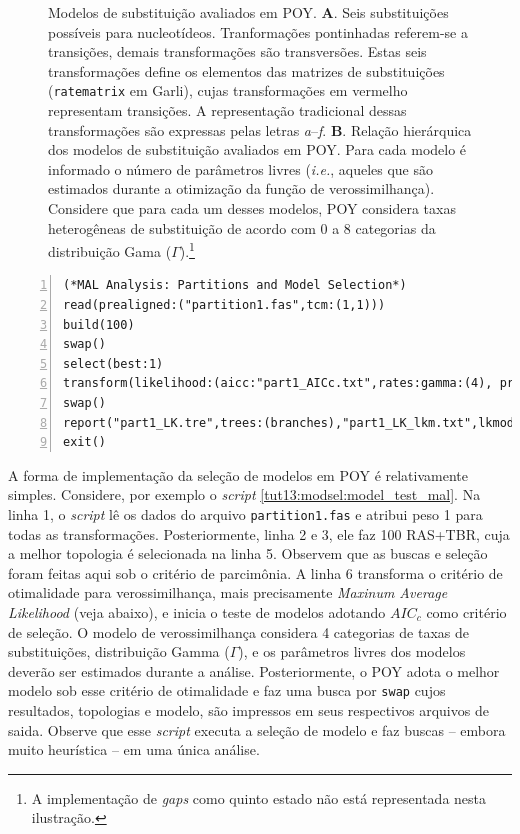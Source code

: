 \begin{refsection}
\begin{figure}[h!]
    {\caption[Modelos de substituição avaliados em POY]{Modelos de substituição avaliados em POY. \textbf{A}. Seis substituições possíveis para nucleotídeos. Tranformações pontinhadas referem-se a transições, demais transformações são transversões. Estas seis transformações define os elementos das matrizes de substituições (\texttt{ratematrix} em Garli), cujas transformações em vermelho representam transições. A representação tradicional dessas transformações são expressas pelas letras \textit{a}--\textit{f}. \textbf{B}. Relação hierárquica dos modelos de substituição avaliados em POY. Para cada modelo é informado o número de parâmetros livres (\textit{i.e.}, aqueles que são estimados durante a otimização da função de verossimilhança). Considere que para cada um desses modelos, POY considera taxas heterogêneas de substituição de acordo com 0 a 8 categorias da distribuição Gama ($\Gamma$).\footnote{A implementação de \textit{gaps} como quinto estado não está representada nesta ilustração.}}\label{tut13:fig:models}}
  \end{figure}

\scriptsize
\begin{lstlisting}[caption={\texttt{model\_test\_part1.poy}.},label=tut13:modsel:model_test_mal, numbers=left, numberblanklines=false]
(*MAL Analysis: Partitions and Model Selection*)
read(prealigned:("partition1.fas",tcm:(1,1)))
build(100)
swap()
select(best:1)
transform(likelihood:(aicc:"part1_AICc.txt",rates:gamma:(4), priors: estimate,mal))
swap()
report("part1_LK.tre",trees:(branches),"part1_LK_lkm.txt",lkmodel)
exit()

\end{lstlisting}
\normalsize

A forma de implementação da seleção de modelos em POY é relativamente simples. Considere, por exemplo o \textit{script} \ref{tut13:modsel:model_test_mal}. Na linha 1, o \textit{script} lê os dados do arquivo \texttt{partition1.fas} e atribui peso 1 para todas as transformações. Posteriormente, linha 2 e 3, ele faz 100 RAS+TBR, cuja a melhor topologia é selecionada na linha 5. Observem que as buscas e seleção foram feitas aqui sob o critério de parcimônia. A linha 6 transforma o critério de otimalidade para verossimilhança, mais precisamente \textit{Maxinum Average Likelihood} (veja abaixo), e inicia o teste de modelos adotando $AIC_{c}$ como critério de seleção. O modelo de verossimilhança considera 4 categorias de taxas de substituições, distribuição Gamma ($\Gamma$), e os parâmetros livres dos modelos deverão ser estimados durante a análise. Posteriormente, o POY adota o melhor modelo sob esse critério de otimalidade e faz uma busca por \texttt{swap} cujos resultados, topologias e modelo, são impressos em seus respectivos arquivos de saida. Observe que esse \textit{script} executa a seleção de modelo e faz buscas -- embora muito heurística -- em uma única análise.


\end{refsection}
